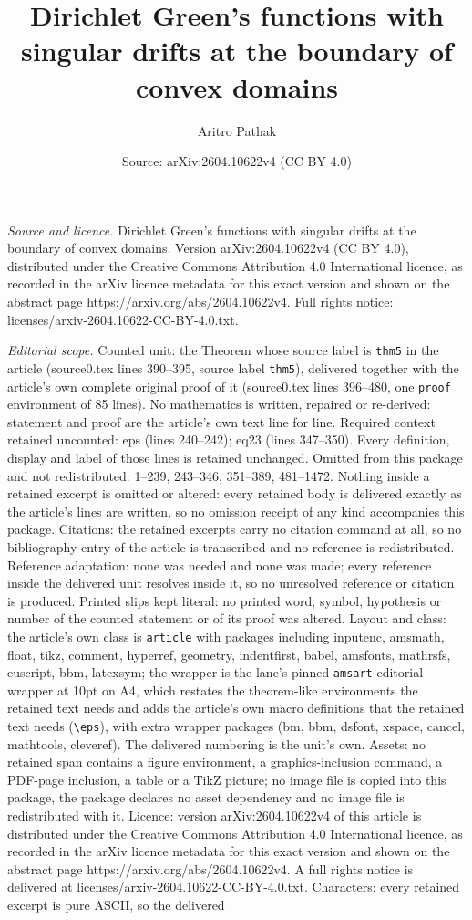 \documentclass[10pt,a4paper]{amsart}
\title[Dirichlet Green's functions with singular drifts at the boun]{Dirichlet Green's functions with singular drifts at the boundary of convex domains}
\author{Aritro Pathak}
\date{Source: arXiv:2604.10622v4 (CC BY 4.0)}
\begin{document}
\maketitle

\noindent\emph{Source and licence.} Dirichlet Green's functions with singular drifts at the boundary of convex domains. Version arXiv:2604.10622v4 (CC BY 4.0), distributed under the Creative Commons Attribution 4.0 International licence, as recorded in the arXiv licence metadata for this exact version and shown on the abstract page https://arxiv.org/abs/2604.10622v4. Full rights notice: licenses/arxiv-2604.10622-CC-BY-4.0.txt.\par\smallskip

\noindent\textit{Editorial scope.} Counted unit: the Theorem whose source label is \texttt{thm5} in the article (source0.tex lines 390--395, source label \texttt{thm5}), delivered together with the article's own complete original proof of it (source0.tex lines 396--480, one \texttt{proof} environment of 85 lines). No mathematics is written, repaired or re-derived: statement and proof are the article's own text line for line. Required context retained uncounted: eps (lines 240--242); eq23 (lines 347--350). Every definition, display and label of those lines is retained unchanged. Omitted from this package and not redistributed: 1--239, 243--346, 351--389, 481--1472. Nothing inside a retained excerpt is omitted or altered: every retained body is delivered exactly as the article's lines are written, so no omission receipt of any kind accompanies this package. Citations: the retained excerpts carry no citation command at all, so no bibliography entry of the article is transcribed and no reference is redistributed. Reference adaptation: none was needed and none was made; every reference inside the delivered unit resolves inside it, so no unresolved reference or citation is produced. Printed slips kept literal: no printed word, symbol, hypothesis or number of the counted statement or of its proof was altered. Layout and class: the article's own class is \texttt{article} with packages including inputenc, amsmath, float, tikz, comment, hyperref, geometry, indentfirst, babel, amsfonts, mathrsfs, euscript, bbm, latexsym; the wrapper is the lane's pinned \texttt{amsart} editorial wrapper at 10pt on A4, which restates the theorem-like environments the retained text needs and adds the article's own macro definitions that the retained text needs (\texttt{\textbackslash eps}), with extra wrapper packages (bm, bbm, dsfont, xspace, cancel, mathtools, cleveref). The delivered numbering is the unit's own. Assets: no retained span contains a figure environment, a graphics-inclusion command, a PDF-page inclusion, a table or a TikZ picture; no image file is copied into this package, the package declares no asset dependency and no image file is redistributed with it. Licence: version arXiv:2604.10622v4 of this article is distributed under the Creative Commons Attribution 4.0 International licence, as recorded in the arXiv licence metadata for this exact version and shown on the abstract page https://arxiv.org/abs/2604.10622v4. A full rights notice is delivered at licenses/arxiv-2604.10622-CC-BY-4.0.txt. Characters: every retained excerpt is pure ASCII, so the delivered 
\end{document}
